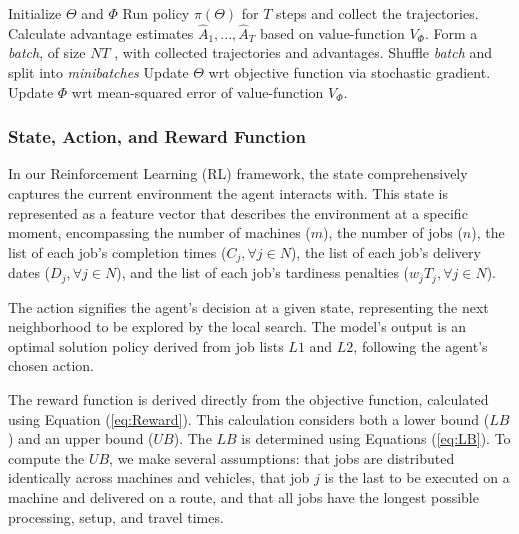 \documentclass{article}
\begin{document}
\begin{algorithm}[H]
\caption{Proximal Policy optimisation\label{alg:PPO}}
\begin{algorithmic}[1]
    \State Initialize $\Theta$ and $\Phi$ 
            \State Run policy $\pi(\Theta)$ for $T$ steps and collect the trajectories.
            \State Calculate advantage estimates $\hat{A}_1, ..., \hat{A}_T$ based on value-function $V_\Phi$.
        \EndFor
        \State Form a \textit{batch}, of size $NT$ , with collected trajectories and advantages.
            \State Shuffle \textit{batch} and split into \textit{minibatches}
                \State Update $\Theta$ wrt objective function via stochastic gradient.
                \State Update $\Phi$ wrt mean-squared error of value-function $V_{\Phi}$.
            \EndFor
        \EndFor
    \EndFor
\end{algorithmic}
\end{algorithm}

\subsubsection{State, Action, and Reward Function} %
In our Reinforcement Learning (RL) framework, the state comprehensively captures the current environment the agent interacts with. This state is represented as a feature vector that describes the environment at a specific moment, encompassing the number of machines ($m$), the number of jobs ($n$), the list of each job's completion times (${C_j, \forall j \in N}$), the list of each job's delivery dates (${D_j, \forall j \in N}$), and the list of each job's tardiness penalties (${w_{j}T_{j}, \forall j \in N}$).

The action signifies the agent's decision at a given state, representing the next neighborhood to be explored by the local search. The model's output is an optimal solution policy derived from job lists $L1$ and $L2$, following the agent's chosen action.

The reward function is derived directly from the objective function, calculated using Equation (\ref{eq:Reward}). This calculation considers both a lower bound ($LB$) and an upper bound ($UB$). The $LB$ is determined using Equations (\ref{eq:LB}). To compute the $UB$, we make several assumptions: that jobs are distributed identically across machines and vehicles, that job $j$ is the last to be executed on a machine and delivered on a route, and that all jobs have the longest possible processing, setup, and travel times.
\end{document}

